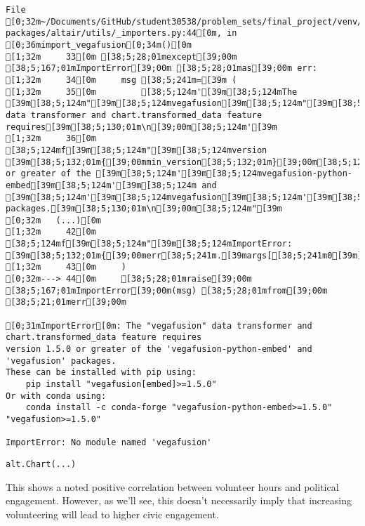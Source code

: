 \documentclass[
  letterpaper,
  DIV=11,
  numbers=noendperiod]{scrartcl}
\begin{document}
\begin{verbatim}
File [0;32m~/Documents/GitHub/student30538/problem_sets/final_project/venv/lib/python3.13/site-packages/altair/utils/_importers.py:44[0m, in [0;36mimport_vegafusion[0;34m()[0m
[1;32m     33[0m [38;5;28;01mexcept[39;00m [38;5;167;01mImportError[39;00m [38;5;28;01mas[39;00m err:
[1;32m     34[0m     msg [38;5;241m=[39m (
[1;32m     35[0m         [38;5;124m'[39m[38;5;124mThe [39m[38;5;124m"[39m[38;5;124mvegafusion[39m[38;5;124m"[39m[38;5;124m data transformer and chart.transformed_data feature requires[39m[38;5;130;01m\n[39;00m[38;5;124m'[39m
[1;32m     36[0m         [38;5;124mf[39m[38;5;124m"[39m[38;5;124mversion [39m[38;5;132;01m{[39;00mmin_version[38;5;132;01m}[39;00m[38;5;124m or greater of the [39m[38;5;124m'[39m[38;5;124mvegafusion-python-embed[39m[38;5;124m'[39m[38;5;124m and [39m[38;5;124m'[39m[38;5;124mvegafusion[39m[38;5;124m'[39m[38;5;124m packages.[39m[38;5;130;01m\n[39;00m[38;5;124m"[39m
[0;32m   (...)[0m
[1;32m     42[0m         [38;5;124mf[39m[38;5;124m"[39m[38;5;124mImportError: [39m[38;5;132;01m{[39;00merr[38;5;241m.[39margs[[38;5;241m0[39m][38;5;132;01m}[39;00m[38;5;124m"[39m
[1;32m     43[0m     )
[0;32m---> 44[0m     [38;5;28;01mraise[39;00m [38;5;167;01mImportError[39;00m(msg) [38;5;28;01mfrom[39;00m [38;5;21;01merr[39;00m

[0;31mImportError[0m: The "vegafusion" data transformer and chart.transformed_data feature requires
version 1.5.0 or greater of the 'vegafusion-python-embed' and 'vegafusion' packages.
These can be installed with pip using:
    pip install "vegafusion[embed]>=1.5.0"
Or with conda using:
    conda install -c conda-forge "vegafusion-python-embed>=1.5.0" "vegafusion>=1.5.0"

ImportError: No module named 'vegafusion'
\end{verbatim}

\begin{verbatim}
alt.Chart(...)
\end{verbatim}

This shows a noted positive correlation between volunteer hours and
political engagement. However, as we'll see, this doesn't necessarily
imply that increasing volunteering will lead to higher civic engagement.
\end{document}
